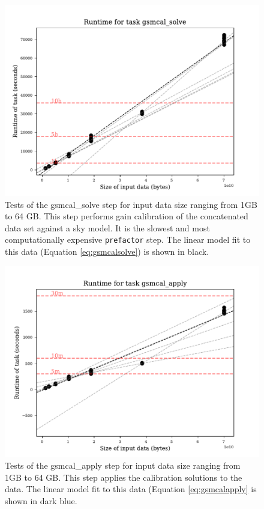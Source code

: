 \documentclass[preprint,5p]{elsarticle}
\begin{document}
\begin{figure}
    \includegraphics[width=0.95\linewidth]{figures/gsmcal_solve_size.pdf}
      \caption{Tests of the gsmcal\_solve step for input data size ranging from 1GB to 64 GB. This step performs gain calibration of the concatenated data set against a sky model. It is the slowest and most computationally expensive \texttt{prefactor} step. The linear model fit to this data (Equation \ref{eq:gsmcalsolve}) is shown in black.  }
	\label{fig:gsmcalsolve_size}
\end{figure}

\begin{figure}
    \includegraphics[width=0.95\linewidth]{figures/gsmcal_apply_size.pdf}
      \caption{Tests of the gsmcal\_apply step for input data size ranging from 1GB to 64 GB. This step applies the calibration solutions to the data. The linear model fit to this data (Equation \ref{eq:gsmcalapply} is shown in dark blue.}
	\label{fig:gsmcalapply_size}
\end{figure}
\end{document}
